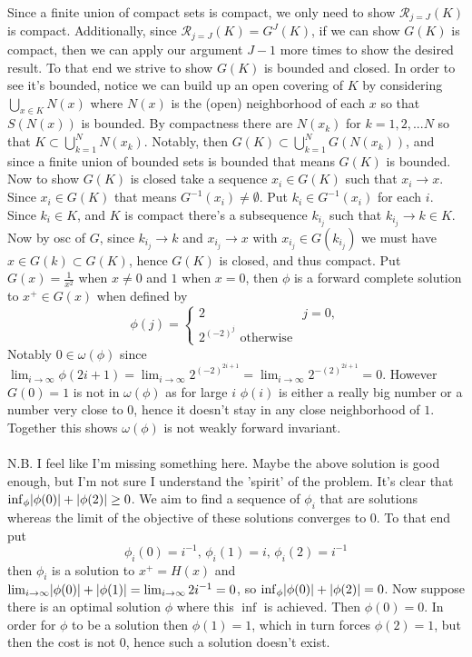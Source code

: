 \documentclass{article}
\newenvironment{ex}[1]
  {\renewcommand\theexercise{#1}\exercise}
  {\endexercise}
\newcommand{\mr}{\mathcal{R}}
\begin{document}
\begin{ex}{3.13}
  Since a finite union of compact sets is compact, we only need to show $\mr_{j=J}(K)$ is compact. Additionally, since $\mr_{j=J}(K) = G^J(K)$, if we can show $G(K)$ is compact, then we can apply our argument $J-1$ more times to show the desired result. To that end we strive to show $G(K)$ is bounded and closed. In order to see it's bounded, notice we can build up an open covering of $K$ by considering $\bigcup_{x \in K} N(x)$ where $N(x)$ is the (open) neighborhood of each $x$ so that $S(N(x))$ is bounded. By compactness there are $N(x_k)$ for $k = 1,2,...N$ so that $K \subset \bigcup_{k=1}^N N(x_k)$. Notably, then $G(K) \subset \bigcup_{k=1}^N G(N(x_k))$, and since a finite union of bounded sets is bounded that means $G(K)$ is bounded.
  \, \\
  Now to show $G(K)$ is closed take a sequence $x_i \in G(K)$ such that $x_i \to x$. Since $x_i \in G(K)$ that means $G^{-1}(x_i) \ne \emptyset$. Put $k_i \in G^{-1}(x_i)$ for each $i$. Since $k_i \in K$, and $K$ is compact there's a subsequence $k_{i_j}$ such that $k_{i_j} \to k \in K$. Now by osc of $G$, since $k_{i_j} \to k$ and $x_{i_j} \to x$ with $x_{i_j} \in G(k_{i_j})$ we must have $x \in G(k) \subset G(K)$, hence $G(K)$ is closed, and thus compact.
\end{ex}
\begin{ex}{3.15}
  Put $G(x) = \frac{1}{x^2}$ when $x \ne 0$ and $1$ when $x = 0$, then $\phi$ is a forward complete solution to $x^+ \in G(x)$ when defined by
  $$
  \phi(j) = \begin{cases}
    2 & j = 0, \\
    2^{(-2)^j} \text{ otherwise}
  \end{cases}
  $$
  Notably $0 \in \omega(\phi)$ since $\lim_{i \to \infty} \phi(2i+1) = \lim_{i \to \infty} 2^{(-2)^{2i + 1}} = \lim_{i \to \infty} 2^{-(2)^{2i+1}} = 0$. However $G(0) = 1$ is not in $\omega(\phi)$ as for large $i$ $\phi(i)$ is either a really big number or a number very close to $0$, hence it doesn't stay in any close neighborhood of $1$. Together this shows $\omega(\phi)$ is not weakly forward invariant.
  \, \\
  \, \\
  N.B. I feel like I'm missing something here. Maybe the above solution is good enough, but I'm not sure I understand the 'spirit' of the problem.
\end{ex}
\begin{ex}{3.17}
  It's clear that $\inf_\phi \lvert\phi(0)\rvert + \lvert\phi(2)\rvert \ge 0$. We aim to find a sequence of $\phi_i$ that are solutions whereas the limit of the objective of these solutions converges to $0$. To that end put
  $$
    \phi_i(0) = i^{-1},\, \phi_i(1) = i, \, \phi_i(2) = i^{-1}
  $$
  then $\phi_i$ is a solution to $x^+ = H(x)$ and $\lim_{i \to \infty} \lvert\phi(0)\rvert + \lvert\phi(1)\rvert = \lim_{i \to \infty} 2i^{-1} = 0$, so $\inf_\phi \lvert\phi(0)\rvert + \lvert\phi(2)\rvert = 0$. Now suppose there is an optimal solution $\phi$ where this $\inf$ is achieved. Then $\phi(0) = 0$. In order for $\phi$ to be a solution then $\phi(1) = 1$, which in turn forces $\phi(2) = 1$, but then the cost is not $0$, hence such a solution doesn't exist.
\end{ex}
\end{document}
